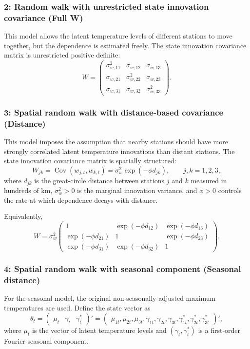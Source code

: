\documentclass[10pt]{article}
\begin{document}
\subsubsection*{2: Random walk with unrestricted state innovation covariance (Full W)}

This model allows the latent temperature levels of different stations to move together, but the dependence is estimated freely.
The state innovation covariance matrix is unrestricted positive definite:
\[
W =
\begin{pmatrix}
\sigma^2_{w,11} & \sigma_{w,12} & \sigma_{w,13} \\
\sigma_{w,21} & \sigma^2_{w,22} & \sigma_{w,23} \\
\sigma_{w,31} & \sigma_{w,32} & \sigma^2_{w,33}
\end{pmatrix}.
\]

\subsubsection*{3: Spatial random walk with distance-based covariance (Distance)}

This model imposes the assumption that nearby stations should have more strongly correlated latent temperature innovations than distant stations.
The state innovation covariance matrix is spatially structured:
\[
W_{jk}
=
\operatorname{Cov}(w_{j,t},w_{k,t})
=
\sigma_w^2 \exp(-\phi d_{jk}),
\qquad j,k=1,2,3,
\]
where \(d_{jk}\) is the great-circle distance between stations \(j\) and \(k\) measured in hundreds of km,
\(\sigma_w^2>0\) is the marginal innovation variance, and \(\phi>0\) controls
the rate at which dependence decays with distance.

Equivalently,
\[
W
=
\sigma_w^2
\begin{pmatrix}
1 & \exp(-\phi d_{12}) & \exp(-\phi d_{13}) \\
\exp(-\phi d_{21}) & 1 & \exp(-\phi d_{23}) \\
\exp(-\phi d_{31}) & \exp(-\phi d_{32}) & 1
\end{pmatrix}.
\]


\subsubsection*{4: Spatial random walk with seasonal component (Seasonal distance)}

For the seasonal model, the original non-seasonally-adjusted maximum temperatures are used.
Define the state vector as
\[
\theta_t =
\begin{pmatrix}
\mu_t & \gamma_t & \gamma_t^*
\end{pmatrix}'
=
\begin{pmatrix}
\mu_{1t}, \mu_{2t}, \mu_{3t}, \gamma_{1t}, \gamma_{2t}, \gamma_{3t}, \gamma^*_{1t}, \gamma^*_{2t}, \gamma^*_{3t}
\end{pmatrix}',
\]
where \(\mu_t\) is the vector of latent temperature levels and
\((\gamma_t,\gamma_t^*)\) is a first-order Fourier seasonal component.
\end{document}
